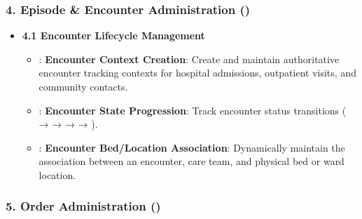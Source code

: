 \subsubsection*{4. Episode \& Encounter Administration (\texttt{})}
\label{rad:enabling:296}

\begin{itemize}

\item
\textbf{4.1 Encounter Lifecycle Management}


\begin{itemize}

\item
\texttt{}: \textbf{Encounter Context Creation}: Create and maintain authoritative encounter tracking contexts for hospital admissions, outpatient visits, and community contacts.



\item
\texttt{}: \textbf{Encounter State Progression}: Track encounter status transitions (\texttt{} → \texttt{} → \texttt{} → \texttt{} → \texttt{}).



\item
\texttt{}: \textbf{Encounter Bed/\allowbreak{}Location Association}: Dynamically maintain the association between an encounter, care team, and physical bed or ward location.



\end{itemize}


\end{itemize}
\label{rad:enabling:301}
\subsubsection*{5. Order Administration (\texttt{})}
\label{rad:enabling:302}

